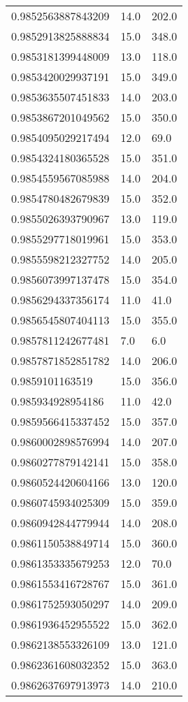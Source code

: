 \begin{center}
\begin{supertabular}[H]{p{0.30\textwidth}p{0.05\textwidth}p{0.05\textwidth}}
0.9852563887843209 & 14.0 & 202.0 \\ 
0.9852913825888834 & 15.0 & 348.0 \\ 
0.9853181399448009 & 13.0 & 118.0 \\ 
0.9853420029937191 & 15.0 & 349.0 \\ 
0.9853635507451833 & 14.0 & 203.0 \\ 
0.9853867201049562 & 15.0 & 350.0 \\ 
0.9854095029217494 & 12.0 & 69.0 \\ 
0.9854324180365528 & 15.0 & 351.0 \\ 
0.9854559567085988 & 14.0 & 204.0 \\ 
0.9854780482679839 & 15.0 & 352.0 \\ 
0.9855026393790967 & 13.0 & 119.0 \\ 
0.9855297718019961 & 15.0 & 353.0 \\ 
0.9855598212327752 & 14.0 & 205.0 \\ 
0.9856073997137478 & 15.0 & 354.0 \\ 
0.9856294337356174 & 11.0 & 41.0 \\ 
0.9856545807404113 & 15.0 & 355.0 \\ 
0.9857811242677481 & 7.0 & 6.0 \\ 
0.9857871852851782 & 14.0 & 206.0 \\ 
0.9859101163519 & 15.0 & 356.0 \\ 
0.985934928954186 & 11.0 & 42.0 \\ 
0.9859566415337452 & 15.0 & 357.0 \\ 
0.9860002898576994 & 14.0 & 207.0 \\ 
0.9860277879142141 & 15.0 & 358.0 \\ 
0.9860524420604166 & 13.0 & 120.0 \\ 
0.9860745934025309 & 15.0 & 359.0 \\ 
0.9860942844779944 & 14.0 & 208.0 \\ 
0.9861150538849714 & 15.0 & 360.0 \\ 
0.9861353335679253 & 12.0 & 70.0 \\ 
0.9861553416728767 & 15.0 & 361.0 \\ 
0.9861752593050297 & 14.0 & 209.0 \\ 
0.9861936452955522 & 15.0 & 362.0 \\ 
0.9862138553326109 & 13.0 & 121.0 \\ 
0.9862361608032352 & 15.0 & 363.0 \\ 
0.9862637697913973 & 14.0 & 210.0 \\ 

\end{supertabular}
\end{center}
